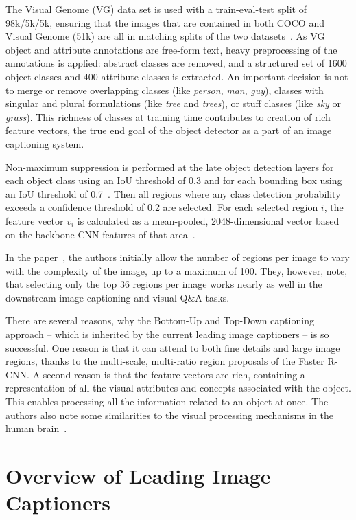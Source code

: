 \documentclass[english,twoside,openright]{HYgraduMLDS}
\begin{document}
The Visual Genome (VG) data set  is used with a train-eval-test split of 98k/5k/5k, ensuring that the images that are contained in both COCO and Visual Genome (51k) are all in matching splits of the two datasets~\cite{BottomUp}. As VG object and attribute annotations are free-form text, heavy preprocessing of the annotations is applied: abstract classes are removed, and a structured set of 1600 object classes and 400 attribute classes is extracted. An important decision is not to merge or remove overlapping classes (like \textit{person}, \textit{man}, \textit{guy}), classes with singular and plural formulations (like \textit{tree} and \textit{trees}), or stuff classes (like \textit{sky} or \textit{grass}). This richness of classes at training time contributes to creation of rich feature vectors, the true end goal of the object detector as a part of an image captioning system.

Non-maximum suppression is performed at the late object detection layers for each object class using an IoU threshold of 0.3 and for each bounding box using an IoU threshold of 0.7~\cite{BottomUpSupplement}. Then all regions where any class detection probability exceeds a confidence threshold of 0.2 are selected. For each selected region $i$, the feature vector $v_i$ is calculated as a mean-pooled, 2048-dimensional vector based on the backbone CNN features of that area~\cite{BottomUp}.

In the paper~\cite{BottomUp}, the authors initially allow the number of regions per image to vary with the complexity of the image, up to a maximum of 100. They, however, note, that selecting only the top 36 regions per image works nearly as well in the downstream image captioning and visual Q\&A tasks. 

There are several reasons, why the Bottom-Up and Top-Down captioning approach -- which is inherited by the current leading image captioners -- is so successful. One reason is that it can attend to both fine details and large image regions, thanks to the multi-scale, multi-ratio region proposals of the Faster R-CNN. A second reason is that the feature vectors are rich, containing a representation of all the visual attributes and concepts associated with the object. This enables processing all the information related to an object at once. The authors also note some similarities to the visual processing mechanisms in the human brain~\cite{BottomUp}. 

\chapter{Overview of Leading Image Captioners}
\label{chapter:captioners}
\end{document}

